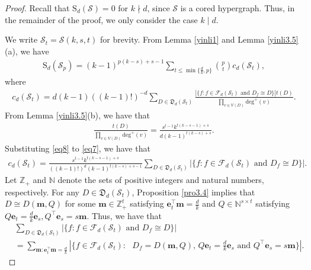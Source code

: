 \documentclass{article}
\begin{document}
\begin{proof}

Recall that $\mathrm{S}_{d}(\mathcal{S})=0$ for $k\nmid d$,
since $\mathcal{S}$ is a cored hypergraph.
Thus, in the remainder of the proof, we only consider the case $k\mid d$.

We write $\mathcal{S}_t=\mathcal{S}(k,s,t)$ for brevity.
From Lemma \ref{yinli1} and  Lemma \ref{yinli3.5}(a), we have
\begin{align}\label{eq6}
\mathrm{S}_{d}(\mathcal{S}_p)=(k-1)^{p(k-s)+s-1}\sum_{t\leq \min\{\frac{d}{k},p\}}\binom{p}{t}c_{d}(\mathcal{S}_t),
\end{align}
where
\begin{align}\label{eq7}
c_{d}(\mathcal{S}_t)=d(k-1)((k-1)!)^{-d}\sum_{D\in\mathfrak{D}_{d}(\mathcal{S}_t)}\frac{|\{f:\mbox{$f\in\mathcal{F}_{d}(\mathcal{S}_t)$ and $D_{f}\cong D$}\}|t(D)}{\prod_{v\in V(D)}\mathrm{deg}^{+}(v)}.
\end{align}
From Lemma \ref{yinli3.5}(b), we have that
\begin{align}\label{eq8}
\frac{t(D)}{\prod_{v\in V(D)}\mathrm{deg}^{+}(v)}=\frac{s^{t-1}k^{t(k-s-1)+s}}{d(k-1)^{t(k-s)+s}}.
\end{align}
Substituting \eqref{eq8} to \eqref{eq7}, we have that
\begin{align}\label{eq12}
  c_{d}(\mathcal{S}_t)=\frac{s^{t-1}k^{t(k-s-1)+s}}{((k-1)!)^{d}(k-1)^{t(k-s)+s-1}}\sum_{D\in\mathfrak{D}_{d}(\mathcal{S}_t)}|\{f:\mbox{$f\in\mathcal{F}_{d}(\mathcal{S}_t)$ and $D_{f}\cong D$}\}|.
\end{align}
Let $\mathbb{Z}_{+}$ and $\mathbb{N}$ denote  the sets of positive integers and natural numbers, respectively.
For any $D \in \mathfrak{D}_d(\mathcal{S}_t)$, Proposition \ref{pro3.4} implies that $D \cong D(\mathbf{m},Q)$
for some $\mathbf{m} \in \mathbb{Z}_{+}^t$ satisfying $\mathbf{e}_t^\top\mathbf{m}=\frac{d}{k}$ and $Q \in \mathbb{N}^{s \times t}$ satisfying $Q\mathbf{e}_t=\frac{d}{k}\mathbf{e}_s,Q^{\top}\mathbf{e}_s=s\mathbf{m}$.
Thus, we have that
\begin{align*}
  &\sum_{D\in\mathfrak{D}_{d}(\mathcal{S}_t)}|\{f:\mbox{$f\in\mathcal{F}_{d}(\mathcal{S}_t)$ and $D_{f}\cong D$}\}| \\ &=\sum_{\mathbf{m}:\mathbf{e}_t^\top\mathbf{m}=\frac{d}{k}}  |\{f\in\mathcal{F}_{d}(\mathcal{S}_t):\mbox{  $D_{f} = D(\mathbf{m},Q)$, $Q\mathbf{e}_t=\frac{d}{k}\mathbf{e}_s$ and $Q^{\top}\mathbf{e}_s=s\mathbf{m}$}\}| .
\end{align*}



\end{proof}
\end{document}

